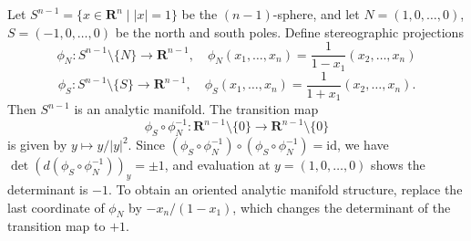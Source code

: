Let $S^{n-1} = \{x \in \mathbf{R}^n \mid |x| = 1\}$ be the $(n-1)$-sphere, and let $N = (1,0,\ldots,0)$, $S = (-1,0,\ldots,0)$ be the north and south poles. Define stereographic projections
\[
\phi_N : S^{n-1} \setminus \{N\} \to \mathbf{R}^{n-1}, \quad
\phi_N(x_1,\ldots,x_n) = \frac{1}{1-x_1}(x_2,\ldots,x_n)
\]
\[
\phi_S : S^{n-1} \setminus \{S\} \to \mathbf{R}^{n-1}, \quad
\phi_S(x_1,\ldots,x_n) = \frac{1}{1+x_1}(x_2,\ldots,x_n).
\]
Then $S^{n-1}$ is an analytic manifold. The transition map
\[
\phi_S \circ \phi_N^{-1} : \mathbf{R}^{n-1} \setminus \{0\} \to \mathbf{R}^{n-1} \setminus \{0\}
\]
is given by $y \mapsto y/|y|^2$. Since $(\phi_S \circ \phi_N^{-1}) \circ (\phi_S \circ \phi_N^{-1}) = \mathrm{id}$, we have $\det(d(\phi_S \circ \phi_N^{-1}))_y = \pm 1$, and evaluation at $y = (1,0,\ldots,0)$ shows the determinant is $-1$. To obtain an oriented analytic manifold structure, replace the last coordinate of $\phi_N$ by $-x_n/(1-x_1)$, which changes the determinant of the transition map to $+1$.
